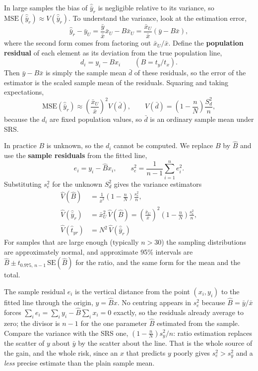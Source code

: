 \documentclass[
  letterpaper,
  DIV=11,
  numbers=noendperiod]{scrreprt}
\renewcommand{\[}{\begin{equation}}
\renewcommand{\]}{\end{equation}}
\begin{document}
In large samples the bias of \(\hat{\bar y}_r\) is negligible relative
to its variance, so
\(\text{MSE}(\hat{\bar y}_r) \approx V(\hat{\bar y}_r)\). To understand
the variance, look at the estimation error, \[
\hat{\bar y}_r - \bar y_U = \frac{\bar y}{\bar x}\bar x_U - B\bar x_U = \frac{\bar x_U}{\bar x}\left(\bar y - B\bar x\right),
\] where the second form comes from factoring out \(\bar x_U/\bar x\).
Define the \textbf{population residual} of each element as its deviation
from the true population line, \[
d_i = y_i - B x_i \qquad (B = t_y/t_x).
\] Then \(\bar y - B\bar x\) is simply the sample mean \(\bar d\) of
these residuals, so the error of the estimator is the scaled sample mean
of the residuals. Squaring and taking expectations, \[
\text{MSE}(\hat{\bar y}_r) \approx \left(\frac{\bar x_U}{\bar x}\right)^2 V(\bar d),
\qquad
V(\bar d) = \left(1 - \frac nN\right)\frac{S_d^2}{n},
\] because the \(d_i\) are fixed population values, so \(\bar d\) is an
ordinary sample mean under SRS.

In practice \(B\) is unknown, so the \(d_i\) cannot be computed. We
replace \(B\) by \(\hat B\) and use the \textbf{sample residuals} from
the fitted line, \[
e_i = y_i - \hat B x_i, \qquad s_e^2 = \frac{1}{n-1}\sum_{i=1}^n e_i^2 .
\] Substituting \(s_e^2\) for the unknown \(S_d^2\) gives the variance
estimators \[
\boxed{\begin{aligned}
\hat V(\hat B) &= \frac{1}{\bar x^2}\left(1 - \frac nN\right)\frac{s_e^2}{n}, \\
\hat V(\hat{\bar y}_r) &= \bar x_U^2\,\hat V(\hat B) = \left(\frac{\bar x_U}{\bar x}\right)^2\left(1 - \frac nN\right)\frac{s_e^2}{n}, \\
\hat V(\hat t_{yr}) &= N^2\,\hat V(\hat{\bar y}_r)
\end{aligned}}
\] For samples that are large enough (typically \(n > 30\)) the sampling
distributions are approximately normal, and approximate 95\% intervals
are \(\hat B \pm t_{0.975,\,n-1}\,\text{SE}(\hat B)\) for the ratio, and
the same form for the mean and the total.

The sample residual \(e_i\) is the vertical distance from the point
\((x_i, y_i)\) to the fitted line through the origin, \(y = \hat B x\).
No centring appears in \(s_e^2\) because \(\hat B = \bar y/\bar x\)
forces \(\sum_i e_i = \sum_i y_i - \hat B\sum_i x_i = 0\) exactly, so
the residuals already average to zero; the divisor is \(n-1\) for the
one parameter \(\hat B\) estimated from the sample. Compare the variance
with the SRS one, \(\left(1-\frac nN\right)s_y^2/n\): ratio estimation
replaces the scatter of \(y\) about \(\bar y\) by the scatter about the
line. That is the whole source of the gain, and the whole risk, since an
\(x\) that predicts \(y\) poorly gives \(s_e^2 > s_y^2\) and a
\emph{less} precise estimate than the plain sample mean.
\end{document}
